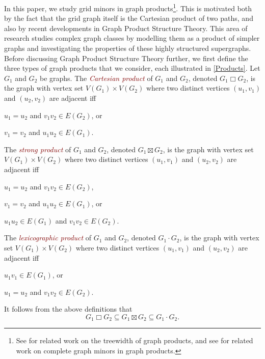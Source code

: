 \documentclass{patmorin}
\newcommand{\defn}[1]{\textcolor{Maroon}{\emph{#1}}}
\newcommand{\boxprod}{\mathbin{\Box}}
\theoremstyle{plain}
\theoremstyle{definition}
\begin{document}

In this paper, we study grid minors in graph products\footnote{See \citep{EH20,HW23,WoodJGT13,EFM22,KOY14,CK06} for related work on the treewidth of graph products, and see \citep{BM98,Wood-NYJM11} for related work on complete graph minors in graph products.}.  This is motivated both by the fact that the grid graph itself is the Cartesian product of two paths, and also by recent developments in Graph Product Structure Theory. This area of research studies complex graph classes by modelling them as a product of simpler graphs and investigating the properties of these highly structured supergraphs. 
Before discussing Graph Product Structure Theory further, we first define the three types of graph products that we consider, each illustrated in \cref{Products}. Let $G_1$ and $G_2$ be graphs. 
The \defn{Cartesian product} of  $G_1$ and $G_2$, denoted $G_1 \boxprod G_2$, is the graph with vertex set $V(G_1) \times V(G_2)$ where two distinct vertices $(u_1, v_1)$ and $(u_2, v_2)$ are adjacent iff 
\begin{compactitem}
    \item $u_1 = u_2$ and $v_1v_2 \in E(G_2)$, or
    \item $v_1 = v_2$ and $u_1u_2 \in E(G_1)$.
\end{compactitem}
The \defn{strong product} of  $G_1$ and $G_2$, denoted $G_1 \boxtimes G_2$, is the graph with vertex set $V(G_1) \times V(G_2)$ where two distinct vertices $(u_1, v_1)$ and $(u_2, v_2)$ are adjacent iff 
\begin{compactitem}
    \item $u_1 = u_2$ and $v_1v_2 \in E(G_2)$, 
    \item $v_1 = v_2$ and $u_1u_2 \in E(G_1)$, or
    \item $u_1u_2 \in E(G_1)$ and $v_1v_2 \in E(G_2)$.
\end{compactitem}
The \defn{lexicographic product} of  $G_1$ and $G_2$, denoted $G_1 \cdot G_2$, is the graph with vertex set $V(G_1) \times V(G_2)$ where two distinct vertices $(u_1, v_1)$ and $(u_2, v_2)$ are adjacent iff
\begin{compactitem}
    \item $u_1v_1 \in E(G_1)$, or
    \item $u_1 = u_2$ and $v_1v_2 \in E(G_2)$.
\end{compactitem}
It follows from the above definitions that 
$$G_1\boxprod G_2 \subseteq G_1\boxtimes G_2 \subseteq G_1 \cdot G_2.$$
\end{document}
